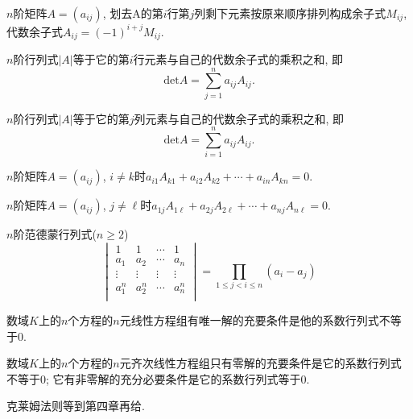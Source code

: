 \begin{Definition}
$n$阶矩阵$A = (a_{ij})$, 划去A的第$i$行第$j$列剩下元素按原来顺序排列构成余子式$M_{ij}$, 代数余子式$A_{ij} = {(-1)}^{i+j} M_{ij}$.
\end{Definition}

\begin{Theorem}
$n$阶行列式$|A|$等于它的第$i$行元素与自己的代数余子式的乘积之和, 即
$$
\mathrm{det} A = \sum_{j=1}^n a_{ij} A_{ij}.
$$
\end{Theorem}


\begin{Theorem}
$n$阶行列式$|A|$等于它的第$j$列元素与自己的代数余子式的乘积之和, 即
$$
\mathrm{det} A = \sum_{i=1}^n a_{ij} A_{ij}.
$$
\end{Theorem}

\begin{Theorem}
$n$阶矩阵$A = (a_{ij})$, $i \neq k$时$a_{i1} A_{k1} + a_{i2} A_{k2} + \cdots + a_{in} A_{kn} = 0$.
\end{Theorem}

\begin{Theorem}
$n$阶矩阵$A = (a_{ij})$, $j \neq \ell$时$a_{1j} A_{1\ell} + a_{2j} A_{2\ell} + \cdots + a_{nj} A_{n\ell} = 0$.
\end{Theorem}

\begin{Proposition} $n$阶范德蒙行列式($n \ge 2$)
$$
\begin{vmatrix} 
1      & 1      & \cdots & 1 \\
a_1    & a_2    & \cdots & a_n \\
\vdots & \vdots & \vdots & \vdots \\
a_1^n  & a_2^n  & \cdots & a_n^n \\
\end{vmatrix} = \prod_{1 \le j < i \le n} {(a_i - a_j)}
$$
\end{Proposition}

\begin{Theorem}
数域$K$上的$n$个方程的$n$元线性方程组有唯一解的充要条件是他的系数行列式不等于$0$.
\end{Theorem}

\begin{Corollary}
数域$K$上的$n$个方程的$n$元齐次线性方程组只有零解的充要条件是它的系数行列式不等于0; 它有非零解的充分必要条件是它的系数行列式等于0.
\end{Corollary}

\begin{Note}
克莱姆法则等到第四章再给.
\end{Note}

